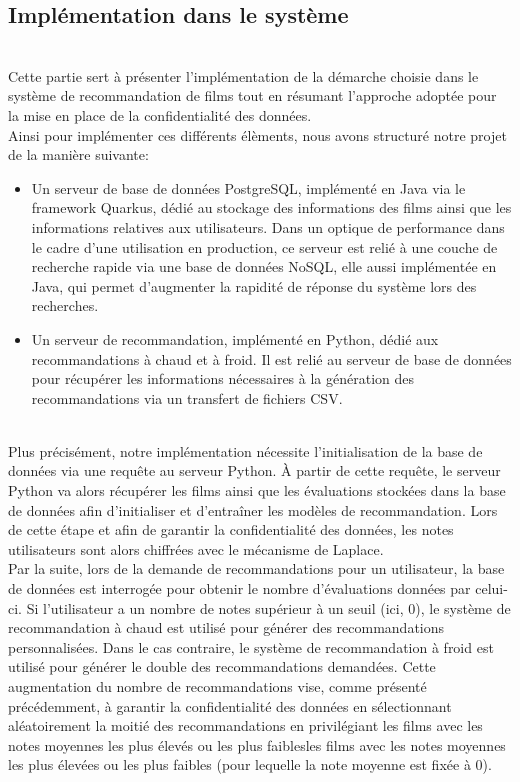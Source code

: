 \documentclass{article}
\begin{document}
\subsection{Implémentation dans le système}
$ $\\
Cette partie sert à présenter l'implémentation de la démarche choisie dans le système de recommandation de films tout en résumant l'approche adoptée pour la mise en place de la confidentialité des données.\\
Ainsi pour implémenter ces différents élèments, nous avons structuré notre projet de la manière suivante:\\
\begin{itemize}
    \item Un serveur de base de données  PostgreSQL, implémenté en Java via le framework Quarkus, dédié au stockage des informations des films ainsi que les informations relatives aux utilisateurs.
    Dans un optique de performance dans le cadre d'une utilisation en production, ce serveur est relié à une couche de recherche rapide via une base de données NoSQL, elle aussi implémentée en Java, 
    qui permet d'augmenter la rapidité de réponse du système lors des recherches.
    \item Un serveur de recommandation, implémenté en Python, dédié aux recommandations à chaud et à froid. Il est relié au serveur de base de données pour récupérer les 
    informations nécessaires à la génération des recommandations via un transfert de fichiers CSV.
\end{itemize}
$ $\\
Plus précisément, notre implémentation nécessite l'initialisation de la base de données via une requête au serveur Python. À partir de cette requête, le serveur Python va alors 
récupérer les films ainsi que les évaluations stockées dans la base de données afin d'initialiser et d'entraîner les modèles de recommandation. Lors de cette étape et afin de garantir 
la confidentialité des données, les notes utilisateurs sont alors chiffrées avec le mécanisme de Laplace.\\
Par la suite, lors de la demande de recommandations pour un utilisateur, la base de données est interrogée pour obtenir le nombre d’évaluations données par celui-ci. Si l'utilisateur a 
un nombre de notes supérieur à un seuil (ici, 0), le système de recommandation à chaud est utilisé pour générer des recommandations personnalisées. Dans le cas contraire, le système de 
recommandation à froid est utilisé pour générer le double des recommandations demandées. Cette augmentation du nombre de recommandations vise, comme présenté précédemment, à garantir la 
confidentialité des données en sélectionnant aléatoirement la moitié des recommandations en privilégiant les films avec les notes moyennes les plus élevés ou les plus faiblesles films avec les notes moyennes les plus élevées ou les plus faibles 
(pour lequelle la note moyenne est fixée à 0).
\end{document}
